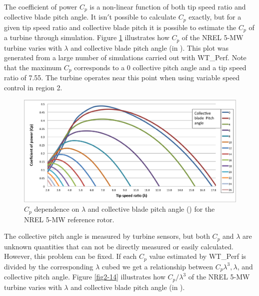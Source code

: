 The coefficient of power $C_p$ is a non-linear function of both tip speed ratio and collective blade pitch angle. It isn$'$t possible to calculate $C_p$ exactly, but for a given tip speed ratio and collective blade pitch it is possible to estimate the $C_p$ of a turbine through simulation.  Figure \ref{fig2-13} illustrates how $C_p$ of the NREL 5-MW turbine varies with $\lambda$ and collective blade pitch angle (in \degree). This plot was generated from a large number of simulations carried out with WT\_Perf.\cite{platt2012} Note that the maximum $C_p$ corresponds to a 0\degree{} collective pitch angle and a tip speed ratio of 7.55. The turbine operates near this point when using variable speed control in region 2. 

\begin{figure}[ht]
	\centering
		\includegraphics[width=\textwidth]{Figures/ch2Figures/fig2-13.png}
		
	\caption{$C_p$ dependence on $\lambda$ and collective blade pitch angle (\degree) for the NREL 5-MW reference rotor.}
	\label{fig2-13}
\end{figure}

The collective pitch angle is measured by turbine sensors, but both $C_p$ and $\lambda$ are unknown quantities that can not be directly measured or easily calculated. However, this problem can be fixed. If each $C_p$ value estimated by WT\_Perf is divided by the corresponding $\lambda$ cubed we get a relationship between $C_p\lambda^3, \lambda$, and collective pitch angle. Figure \ref{fig2-14}  illustrates how $C_p / \lambda^3$ of the NREL 5-MW turbine varies with $\lambda$ and collective blade pitch angle (in \degree). 

